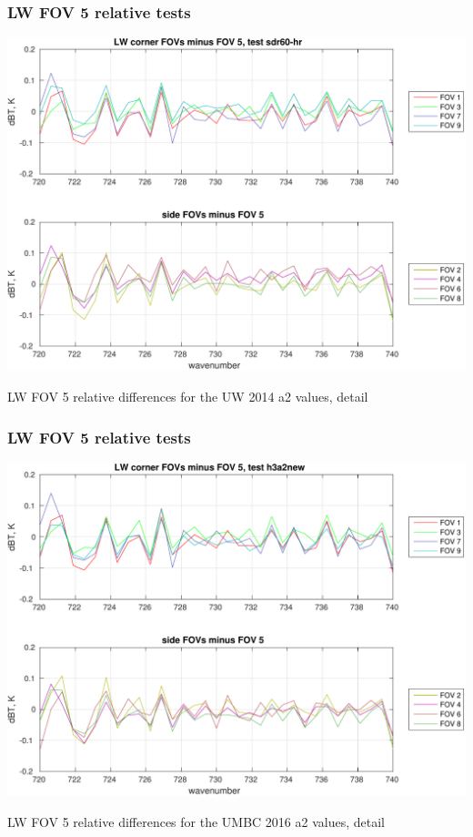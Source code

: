 \documentclass[11pt]{beamer}
\begin{document}
\begin{frame}
\frametitle{LW FOV 5 relative tests}
\begin{center}
  \includegraphics[scale=0.5]{figures/LW_rel_zoom2_sdr60.pdf}
\end{center}
\begin{center}
  LW FOV 5 relative differences for the UW 2014 a2 values, detail
\end{center}
\end{frame}
\begin{frame}
\frametitle{LW FOV 5 relative tests}
\begin{center}
  \includegraphics[scale=0.5]{figures/LW_rel_zoom2_a2new.pdf}
\end{center}
\begin{center}
  LW FOV 5 relative differences for the UMBC 2016 a2 values, detail
\end{center}
\end{frame}
\end{document}
